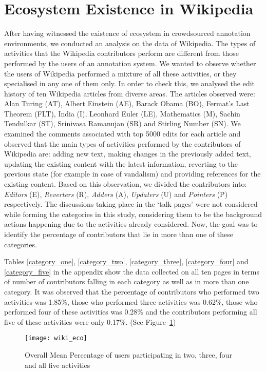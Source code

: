 \documentclass{llncs}
\begin{document}
\section{Ecosystem Existence in Wikipedia}
After having witnessed the existence of ecosystem in crowdsourced annotation environments, we conducted an analysis on the data of Wikipedia.  The types of activities that the Wikipedia contributors perform are different from those performed by the users of an annotation system. We wanted to observe whether the users of Wikipedia performed a mixture of all these activities, or they specialised in any one of them only. In order to check this, we analysed the edit history of ten Wikipedia articles from diverse areas. The articles observed were: Alan Turing (AT), Albert Einstein (AE), Barack Obama (BO), Fermat's Last Theorem (FLT), India (I), Leonhard Euler (LE), Mathematics (M), Sachin Tendulkar (ST), Srinivasa Ramanujan (SR) and Stirling Number (SN). We examined the comments associated with top 5000 edits for each article and observed that the main types of activities performed by the contributors of Wikipedia are: adding new text, making changes in the previously added text, updating the existing content with the latest information, reverting to the previous state (for example in case of vandalism) and providing references for the existing content. Based on this observation, we divided the contributors into: \textit{Editors} (E), \textit{Reverters} (R), \textit{Adders} (A), \textit{Updaters} (U) and \textit{Pointers} (P) respectively. The discussions taking place in the `talk pages' were not considered while forming the categories in this study, considering them to be the background actions happening due to the activities already considered. Now, the goal was to identify the percentage of contributors that lie in more than one of these categories.

Tables \ref{category_one}, \ref{category_two}, \ref{category_three}, \ref{category_four} and \ref{category_five} in the appendix show the data collected on all ten pages in terms of number of contributors falling in each category as well as in more than one category. It was observed that the percentage of contributors who performed two activities was 1.85\%, those who performed three activities was 0.62\%, those who performed four of these activities was 0.28\% and the contributors performing all five of these activities were only 0.17\%. (See Figure~\ref{fig:wiki_eco})
\begin{figure}[htbp]
\centering
\texttt{[image: wiki\_eco]}
\caption{Overall Mean Percentage of users participating in two, three, four and all five activities}
\label{fig:wiki_eco}
\end{figure}
\end{document}
